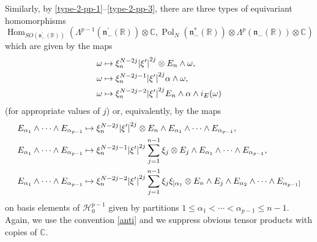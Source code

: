 \documentclass[a4paper,12pt,reqno]{amsart}
\numberwithin{theorem}{subsection}
\numberwithin{equation}{section}
\begin{document}
Similarly, by \eqref{type-2-pp-1}--\eqref{type-2-pp-3}, there are three types
of equivariant homomorphisms
\begin{equation*}\label{second-type}
   {\operatorname{Hom}}_{SO({{\mathfrak n}}_-^\prime({\mathbb{R}}))}(\Lambda^{p-1}({{\mathfrak n}}_-^\prime({\mathbb{R}})) \otimes {\mathbb{C}},
   {\operatorname{Pol}}_N({{\mathfrak n}}_-^*({\mathbb{R}})) \otimes \Lambda^p ({{\mathfrak n}}_-({\mathbb{R}})) \otimes {\mathbb{C}})
\end{equation*}
which are given by the maps
\begin{align}\label{type-2-N-gen}
   \omega & \mapsto \xi_n^{N-2j} {\lvert{\xi'}\rvert}^{2j} \otimes E_n \wedge \omega, \notag \\
   \omega & \mapsto \xi_n^{N-2j-1} {\lvert{\xi'}\rvert}^{2j} \alpha \wedge \omega, \notag \\
   \omega & \mapsto \xi_n^{N-2j-2} {\lvert{\xi'}\rvert}^{2j} E_n \wedge \alpha \wedge i_E (\omega)
\end{align}
(for appropriate values of $j$) or, equivalently, by the maps
\begin{align}\label{type-2-N}
   E_{\alpha_1}\wedge \cdots \wedge E_{\alpha_{p-1}} &
   \mapsto \xi_n^{N-2j} {\lvert{\xi'}\rvert}^{2j} \otimes E_n \wedge E_{\alpha_1} \wedge \cdots \wedge E_{\alpha_{p-1}},
   \notag \\
   E_{\alpha_1}\wedge \cdots \wedge E_{\alpha_{p-1}} &
   \mapsto \xi_n^{N-2j-1} {\lvert{\xi'}\rvert}^{2j} \sum_{j=1}^{n-1} \xi_j \otimes E_j
   \wedge E_{\alpha_1}\wedge\cdots\wedge E_{\alpha_{p-1}}, \notag \\
   E_{\alpha_1} \wedge \cdots \wedge E_{\alpha_{p-1}} & \mapsto
   \xi_n^{N-2j-2} {\lvert{\xi'}\rvert}^{2j} \sum_{j=1}^{n-1} \xi_j \xi_{[\alpha_1}
   \otimes E_n \wedge E_j \wedge E_{\alpha_2} \wedge \cdots \wedge E_{\alpha_{p-1}]}
\end{align}
on basis elements of ${\mathcal H}_0^{p-1}$ given by partitions $1\leq \alpha_1 < \cdots
<\alpha_{p-1} \leq n-1$. Again, we use the convention \eqref{anti} and we
suppress obvious tensor products with copies of ${\mathbb{C}}$.
\end{document}
